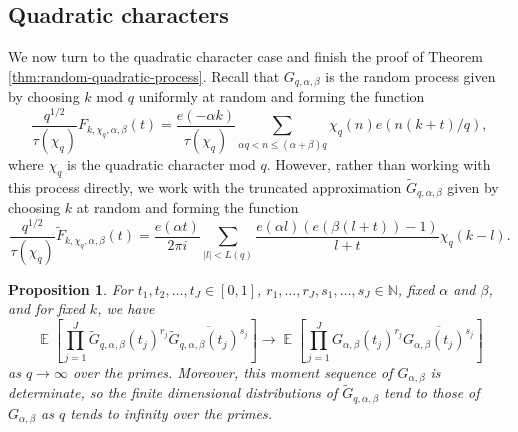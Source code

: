 \documentclass[12pt, a4paper]{amsart}
\newtheorem{proposition}{Proposition}
\theoremstyle{remark}
\newcommand{\N}{\mathbb{N}}
\newcommand{\abs}[1]{\left|#1\right|}
\DeclareMathOperator{\E}{\mathbb{E}}
\begin{document}
\subsection{Quadratic characters}

We now turn to the quadratic character case and finish the proof of Theorem \ref{thm:random-quadratic-process}. Recall that
$G_{q, \alpha, \beta}$ is the random process given by
choosing $k$ mod $q$ uniformly at random and forming the
function
\[
    \frac{q^{1/2}}{\tau(\chi_q)}
    F_{k, \chi_q, \alpha, \beta}(t) = \frac{e(-\alpha k)}{\tau(\chi_q)}
        \sum_{\alpha q < n \leq (\alpha + \beta)q} \chi_q(n)e(n(k + t)/q),
\]
where $\chi_q$ is the quadratic character mod $q$.
However, rather than working with this process directly, we work with
the truncated approximation $\tilde G_{q, \alpha, \beta}$ given by choosing
$k$ at random and forming the function
\[
    \frac{q^{1/2}}{\tau(\chi_q)}
    \tilde F_{k,\chi_q,\alpha,\beta}(t)
    = \frac{e(\alpha t)}{2\pi i}
    \sum_{\abs{l} < L(q)}
    \frac{e(\alpha l) (e(\beta(l + t)) - 1)}
    {l + t }
    \chi_q(k-l).
\]

\begin{proposition}\label{prop:quadratic-moments}
    For $t_1, t_2, \ldots, t_J \in [0,1]$, $r_1, \ldots, r_J, s_1, \ldots, s_J \in \N$,
    fixed $\alpha$ and $\beta$, and for fixed $k$, we have
\[
    \E \left[ \prod_{j=1}^J \tilde G_{q,\alpha,\beta}(t_j)^{r_j} \overline{\tilde G_{q,\alpha,\beta}(t_j)^{s_j}} \right]
    \longrightarrow
    \E \left[ \prod_{j=1}^J G_{\alpha,\beta}(t_j)^{r_j} \overline{G_{\alpha,\beta}(t_j)^{s_j}} \right]
\]
as $q \rightarrow \infty$ over the primes. Moreover, this moment sequence of
$G_{\alpha,\beta}$ is determinate, so the finite dimensional distributions of
$\tilde G_{q,\alpha,\beta}$ tend to those of $G_{\alpha,\beta}$ as $q$ tends to infinity
over the primes.
\end{proposition}
\end{document}
